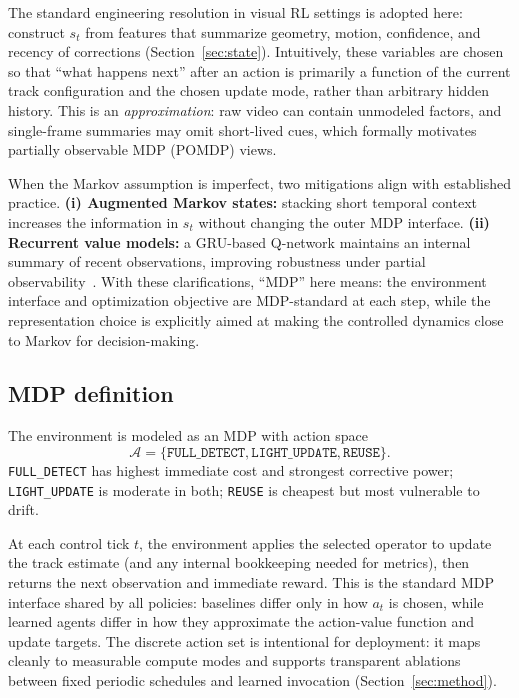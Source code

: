 \documentclass[letterpaper]{article}
\begin{document}
The standard engineering resolution in visual RL settings is adopted here: construct $s_t$ from features that summarize geometry, motion, confidence, and recency of corrections (Section~\ref{sec:state}). Intuitively, these variables are chosen so that ``what happens next'' after an action is primarily a function of the current track configuration and the chosen update mode, rather than arbitrary hidden history. This is an \emph{approximation}: raw video can contain unmodeled factors, and single-frame summaries may omit short-lived cues, which formally motivates partially observable MDP (POMDP) views.

When the Markov assumption is imperfect, two mitigations align with established practice. \textbf{(i) Augmented Markov states:} stacking short temporal context increases the information in $s_t$ without changing the outer MDP interface. \textbf{(ii) Recurrent value models:} a GRU-based Q-network maintains an internal summary of recent observations, improving robustness under partial observability~\cite{hausknecht2015drqn}. With these clarifications, ``MDP'' here means: the environment interface and optimization objective are MDP-standard at each step, while the representation choice is explicitly aimed at making the controlled dynamics close to Markov for decision-making.

\subsection{MDP definition}
The environment is modeled as an MDP with action space
\[
\mathcal{A} = \{\texttt{FULL\_DETECT}, \texttt{LIGHT\_UPDATE}, \texttt{REUSE}\}.
\]
\texttt{FULL\_DETECT} has highest immediate cost and strongest corrective power; \texttt{LIGHT\_UPDATE} is moderate in both; \texttt{REUSE} is cheapest but most vulnerable to drift.

At each control tick $t$, the environment applies the selected operator to update the track estimate (and any internal bookkeeping needed for metrics), then returns the next observation and immediate reward. This is the standard MDP interface shared by all policies: baselines differ only in how $a_t$ is chosen, while learned agents differ in how they approximate the action-value function and update targets. The discrete action set is intentional for deployment: it maps cleanly to measurable compute modes and supports transparent ablations between fixed periodic schedules and learned invocation (Section~\ref{sec:method}).
\end{document}
